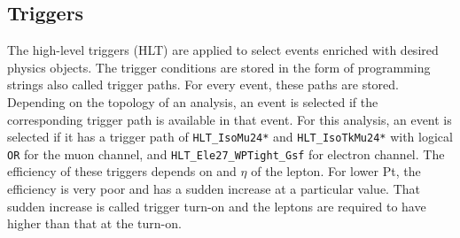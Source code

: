 \subsection{Triggers}
The high-level triggers (HLT) are applied to select events enriched
with desired physics objects. The trigger conditions are stored in the form of
programming strings also called trigger paths. For every event, these paths are
stored. Depending on the topology of an analysis, an event is selected if the
corresponding trigger path is available in that event. For this analysis, an
event is selected if it has a trigger path of \verb|HLT_IsoMu24*| and
\verb|HLT_IsoTkMu24*| with logical \verb|OR| for the muon channel, and
\verb|HLT_Ele27_WPTight_Gsf| for electron channel. The efficiency of these
triggers depends on \pt and $\eta$ of the lepton. For lower Pt, the efficiency is
very poor and has a sudden increase at a particular value. That sudden increase is called trigger turn-on and the leptons are required to have \pt higher than that at the
turn-on.

